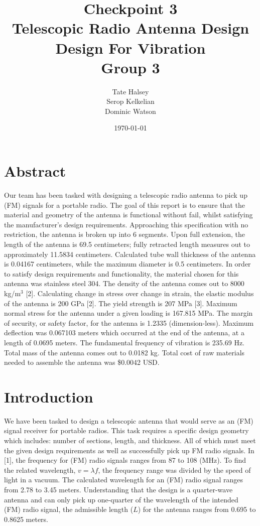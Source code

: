 \documentclass[12pt]{article}
\title{Checkpoint 3\\Telescopic Radio Antenna Design\\Design For Vibration\\Group 3}
\author{Tate Halsey\\Serop Kelkelian\\Dominic Watson}
\date{\today}
\begin{document}
%
\maketitle
\newpage

\tableofcontents
\newpage

\section{Abstract}
Our team has been tasked with designing a telescopic radio antenna to pick up (FM) signals for a portable radio. The goal of this report is to ensure that the material and geometry of the antenna is functional without fail, whilst satisfying the manufacturer’s design requirements. Approaching this specification with no restriction, the antenna is broken up into 6 segments. Upon full extension, the length of the antenna is 69.5 centimeters; fully retracted length measures out to approximately 11.5834 centimeters. Calculated tube wall thickness of the antenna is 0.04167 centimeters, while the maximum diameter is 0.5 centimeters. In order to satisfy design requirements and functionality, the material chosen for this antenna was stainless steel 304. The density of the antenna comes out to 8000 kg/m$^3$ [2]. Calculating change in stress over change in strain, the elastic modulus of the antenna is 200 GPa [2]. The yield strength is 207 MPa [3]. Maximum normal stress for the antenna under a given loading is 167.815 MPa. The margin of security, or safety factor, for the antenna is 1.2335 (dimension-less). Maximum deflection was 0.067103 meters which occurred at the end of the antenna, at a length of 0.0695 meters. The fundamental frequency of vibration is 235.69 Hz. Total mass of the antenna comes out to 0.0182 kg. Total cost of raw materials needed to assemble the antenna was \$0.0042 USD.
\newpage

\section{Introduction}
We have been tasked to design a telescopic antenna that would serve as an (FM) signal receiver for portable radios. This task requires a specific design geometry which includes: number of sections, length, and thickness. All of which must meet the given design requirements as well as successfully pick up FM radio signals. In [1], the frequency for (FM) radio signals ranges from 87 to 108 (MHz). To find the related wavelength, $v=\lambda f$, the frequency range was divided by the speed of light in a vacuum. The calculated wavelength for an (FM) radio signal ranges from 2.78 to 3.45 meters. Understanding that the design is a quarter-wave antenna and can only pick up one-quarter of the wavelength of the intended (FM) radio signal, the admissible length ($L$) for the antenna ranges from 0.695 to 0.8625 meters.
\newpage
\end{document}
